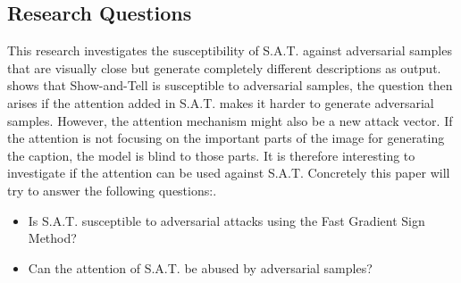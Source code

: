 \subsection{Research Questions}
This research investigates the susceptibility of S.A.T. against adversarial samples that are visually close but generate completely different descriptions as output. \citeauthor{Hongge} shows that Show-and-Tell is susceptible to adversarial samples, the question then arises if the attention added in S.A.T. makes it harder to generate adversarial samples. However, the attention mechanism might also be a new attack vector. If the attention is not focusing on the important parts of the image for generating the caption, the model is blind to those parts. It is therefore interesting to investigate if the attention can be used against S.A.T.
Concretely this paper will try to answer the following questions:.
\begin{itemize}
    \item Is S.A.T. susceptible to adversarial attacks using the Fast Gradient Sign Method?
    \item Can the attention of S.A.T. be abused by adversarial samples?
\end{itemize}
